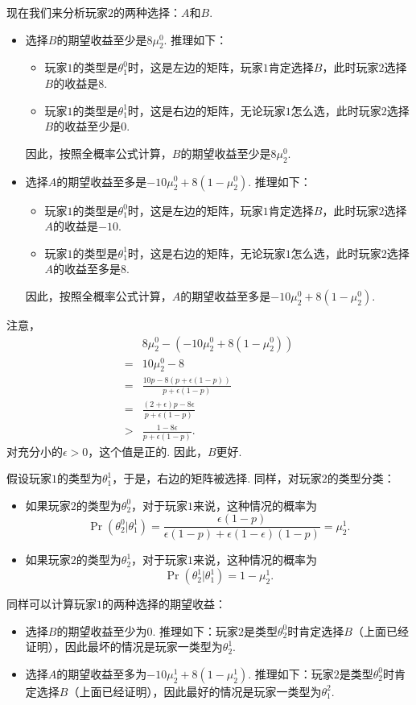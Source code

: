 现在我们来分析玩家$2$的两种选择：$A$和$B$.
\begin{itemize}
    \item 选择$B$的期望收益至少是$8\mu_2^0$. 推理如下：
    \begin{itemize}
        \item 玩家$1$的类型是$\theta_1^0$时，这是左边的矩阵，玩家$1$肯定选择$B$，此时玩家$2$选择$B$的收益是$8$.
        \item 玩家$1$的类型是$\theta_1^1$时，这是右边的矩阵，无论玩家$1$怎么选，此时玩家$2$选择$B$的收益至少是$0$.
    \end{itemize}
    因此，按照全概率公式计算，$B$的期望收益至少是$8\mu_2^0$.
    \item 选择$A$的期望收益至多是$-10\mu_2^0 + 8(1 - \mu_2^0)$. 推理如下：
    \begin{itemize}
        \item 玩家$1$的类型是$\theta_1^0$时，这是左边的矩阵，玩家$1$肯定选择$B$，此时玩家$2$选择$A$的收益是$-10$.
        \item 玩家$1$的类型是$\theta_1^1$时，这是右边的矩阵，无论玩家$1$怎么选，此时玩家$2$选择$A$的收益至多是$8$.
    \end{itemize}
    因此，按照全概率公式计算，$A$的期望收益至多是$-10\mu_2^0 + 8(1 - \mu_2^0)$.
\end{itemize}

注意，
\begin{align*}
    &8\mu_2^0-(-10\mu_2^0 + 8(1 - \mu_2^0))\\
    =& 10\mu_2^0 - 8\\
    =& \frac{10p-8(p+\epsilon(1-p))}{p+\epsilon(1-p)}\\
    =& \frac{(2+\epsilon)p-8\epsilon}{p+\epsilon(1-p)}\\
    >& \frac{1-8\epsilon}{p+\epsilon(1-p)}.
\end{align*}
对充分小的$\epsilon>0$，这个值是正的. 因此，$B$更好.

假设玩家$1$的类型为$\theta_1^1$，于是，右边的矩阵被选择. 同样，对玩家$2$的类型分类：
\begin{itemize}
    \item 如果玩家$2$的类型为$\theta_2^0$，对于玩家$1$来说，这种情况的概率为
    \[\Pr(\theta_2^0|\theta_1^1) = \frac{\epsilon(1-p)}{\epsilon(1-p)+\epsilon(1-\epsilon)(1-p)} = \mu_2^1.\]
    \item 如果玩家$2$的类型为$\theta_2^1$，对于玩家$1$来说，这种情况的概率为
    \[\Pr(\theta_2^1|\theta_1^1) = 1 - \mu_2^1.\]
\end{itemize}
同样可以计算玩家$1$的两种选择的期望收益：
\begin{itemize}
    \item 选择$B$的期望收益至少为$0$. 推理如下：玩家$2$是类型$\theta_2^0$时肯定选择$B$（上面已经证明），因此最坏的情况是玩家一类型为$\theta_2^1$. 
    \item 选择$A$的期望收益至多为$-10\mu_2^1 + 8(1 - \mu_2^1)$. 推理如下：玩家$2$是类型$\theta_2^0$时肯定选择$B$（上面已经证明），因此最好的情况是玩家一类型为$\theta_1^2$.
\end{itemize}

